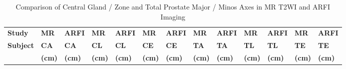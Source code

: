 \begin{table}
\centering
\caption{Comparison of Central Gland / Zone and Total Prostate Major / Minos Axes in MR T2WI and ARFI Imaging}
\begin{tabular}{|l|l|l|l|l|l|l|l|l|l|l|l|l|} \hline
{\bf Study} & {\bf MR} & {\bf ARFI} & {\bf MR} & {\bf ARFI} & {\bf MR} & {\bf ARFI} & {\bf MR} & {\bf ARFI} & {\bf MR} & {\bf ARFI} & {\bf MR} & {\bf ARFI} \\ 
{\bf Subject} & {\bf CA} & {\bf CA} & {\bf CL} & {\bf CL} & {\bf CE} & {\bf CE} & {\bf TA} & {\bf TA} & {\bf TL} & {\bf TL} & {\bf TE} & {\bf TE} \\
 & {\bf (cm)} & {\bf (cm)} & {\bf (cm)} & {\bf (cm)} & {\bf (cm)} & {\bf (cm)} & {\bf (cm)} & {\bf (cm)} & {\bf (cm)} & {\bf (cm)} & {\bf (cm)} & {\bf (cm)} \\ \hline

\hline
\end{tabular}
\label{tab:mr_arfi_axes}
\end{table}
